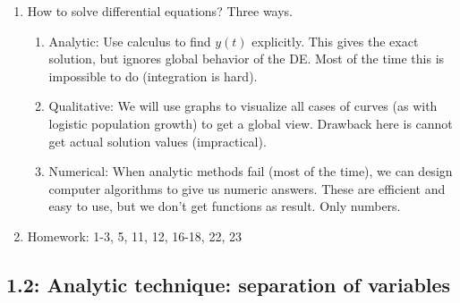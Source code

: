 \documentclass{article}
\begin{document}
\begin{enumerate}
\begin{enumerate}
\end{enumerate}


\item How to solve differential equations? Three ways.
\begin{enumerate}
\item Analytic: Use calculus to find $y(t)$ explicitly. This gives the exact solution, but ignores global behavior of the DE. Most of the time this is impossible to do (integration is hard). 
\item Qualitative: We will use graphs to visualize all cases of curves (as with logistic population growth) to get a global view. Drawback here is cannot get actual solution values (impractical).
\item Numerical: When analytic methods fail (most of the time), we can design computer algorithms to give us numeric answers. These are efficient and easy to use, but we don't get functions as result. Only numbers.
\end{enumerate}


\item Homework: 1-3, 5, 11, 12, 16-18, 22, 23

\end{enumerate}

\subsection{1.2: Analytic technique: separation of variables}
\end{document}
